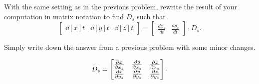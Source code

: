 \documentclass{ximera}
\begin{document}
\begin{problem}
  With the same setting as in the previous problem, rewrite the result
  of your computation in matrix notation to find $D_s$
  such that
\[
\begin{bmatrix}
\dd[x]{t} & \dd[y]{t} & \dd[z]{t}
\end{bmatrix}
=
\begin{bmatrix}
\frac{dx_s}{dt} & \frac{dy_s}{dt}
\end{bmatrix}\cdot D_s.
\]
\begin{hint}
  Simply write down the answer from a previous problem with some minor
  changes.
\end{hint}
\begin{freeResponse}
  \[
  D_s =
  \begin{bmatrix}
    \pp[x]{x_s} & \pp[y]{x_s} & \pp[z]{x_s} \\
    \pp[x]{y_s}   & \pp[y]{y_s}   & \pp[z]{y_s}
  \end{bmatrix}.
  \]
\end{freeResponse}
\end{problem}
\end{document}
